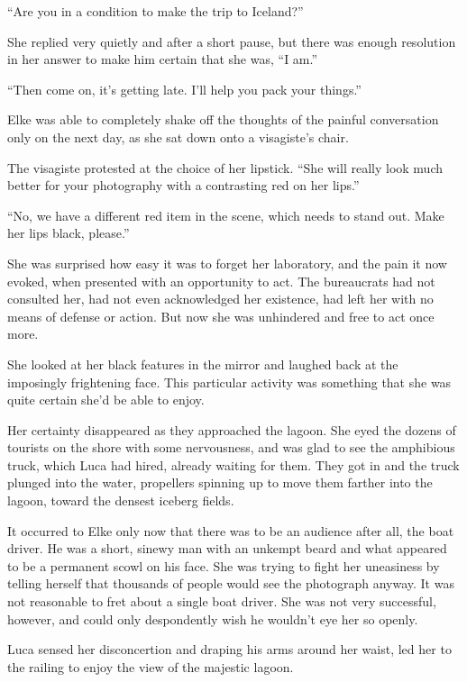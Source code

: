``Are you in a condition to make the trip to Iceland?''

She replied very quietly and after a short pause, but there was enough resolution in her answer to make him certain that she was, ``I am.''

``Then come on, it's getting late. I'll help you pack your things.''

\sectionline

Elke was able to completely shake off the thoughts of the painful conversation only on the next day, as she sat down onto a visagiste's chair.

The visagiste protested at the choice of her lipstick. ``She will really look much better for your photography with a contrasting red on her lips.''

``No, we have a different red item in the scene, which needs to stand out. Make her lips black, please.''

She was surprised how easy it was to forget her laboratory, and the pain it now evoked, when presented with an opportunity to act. The bureaucrats had not consulted her, had not even acknowledged her existence, had left her with no means of defense or action. But now she was unhindered and free to act once more.

She looked at her black features in the mirror and laughed back at the imposingly frightening face. This particular activity was something that she was quite certain she'd be able to enjoy.

\sectionline

Her certainty disappeared as they approached the lagoon. She eyed the dozens of tourists on the shore with some nervousness, and was glad to see the amphibious truck, which Luca had hired, already waiting for them. They got in and the truck plunged into the water, propellers spinning up to move them farther into the lagoon, toward the densest iceberg fields.

It occurred to Elke only now that there was to be an audience after all, the boat driver. He was a short, sinewy man with an unkempt beard and what appeared to be a permanent scowl on his face. She was trying to fight her uneasiness by telling herself that thousands of people would see the photograph anyway. It was not reasonable to fret about a single boat driver. She was not very successful, however, and could only despondently wish he wouldn't eye her so openly.

Luca sensed her disconcertion and draping his arms around her waist, led her to the railing to enjoy the view of the majestic lagoon.

